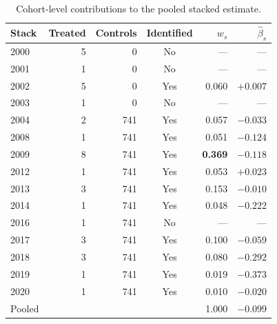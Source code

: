 \begin{table}[t]\centering
\caption{Cohort-level contributions to the pooled stacked estimate.}
\label{tab:cohort-weights}
\begin{tabular}{lrrcrr}
\toprule
Stack & Treated & Controls & Identified & $w_s$ & $\hat\beta_s$ \\
\midrule
2000 & 5 & 0   & No  & ---   & ---     \\
2001 & 1 & 0   & No  & ---   & ---     \\
2002 & 5 & 0   & Yes & 0.060 & $+0.007$ \\
2003 & 1 & 0   & No  & ---   & ---     \\
2004 & 2 & 741 & Yes & 0.057 & $-0.033$ \\
2008 & 1 & 741 & Yes & 0.051 & $-0.124$ \\
2009 & 8 & 741 & Yes & \textbf{0.369} & $-0.118$ \\
2012 & 1 & 741 & Yes & 0.053 & $+0.023$ \\
2013 & 3 & 741 & Yes & 0.153 & $-0.010$ \\
2014 & 1 & 741 & Yes & 0.048 & $-0.222$ \\
2016 & 1 & 741 & No  & ---   & ---     \\
2017 & 3 & 741 & Yes & 0.100 & $-0.059$ \\
2018 & 3 & 741 & Yes & 0.080 & $-0.292$ \\
2019 & 1 & 741 & Yes & 0.019 & $-0.373$ \\
2020 & 1 & 741 & Yes & 0.010 & $-0.020$ \\
\midrule
Pooled & & & & 1.000 & $-0.099$ \\
\bottomrule
\end{tabular}
\end{table}